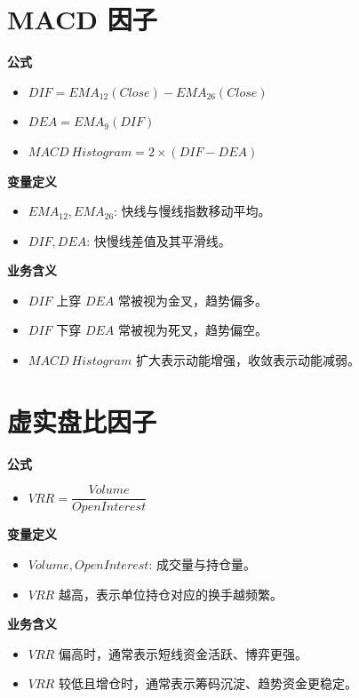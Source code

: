 \documentclass[11pt,a4paper]{ctexart}
\begin{document}
\section*{MACD 因子}
\textbf{公式}
\begin{itemize}
\item $DIF=EMA_{12}(Close)-EMA_{26}(Close)$
\item $DEA=EMA_{9}(DIF)$
\item $MACD\ Histogram=2\times(DIF-DEA)$
\end{itemize}
\textbf{变量定义}
\begin{itemize}
\item $EMA_{12}, EMA_{26}$: 快线与慢线指数移动平均。
\item $DIF, DEA$: 快慢线差值及其平滑线。
\end{itemize}
\textbf{业务含义}
\begin{itemize}
\item $DIF$ 上穿 $DEA$ 常被视为金叉，趋势偏多。
\item $DIF$ 下穿 $DEA$ 常被视为死叉，趋势偏空。
\item $MACD\ Histogram$ 扩大表示动能增强，收敛表示动能减弱。
\end{itemize}

\section*{虚实盘比因子}
\textbf{公式}
\begin{itemize}
\item $VRR=\dfrac{Volume}{OpenInterest}$
\end{itemize}
\textbf{变量定义}
\begin{itemize}
\item $Volume, OpenInterest$: 成交量与持仓量。
\item $VRR$ 越高，表示单位持仓对应的换手越频繁。
\end{itemize}
\textbf{业务含义}
\begin{itemize}
\item $VRR$ 偏高时，通常表示短线资金活跃、博弈更强。
\item $VRR$ 较低且增仓时，通常表示筹码沉淀、趋势资金更稳定。
\end{itemize}
\end{document}
